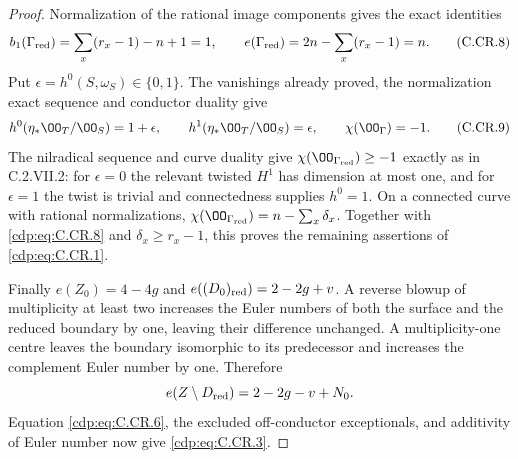 \begin{proof}
Normalization of the rational image components gives the
exact identities
\[
 b_1(\Gamma_{\rm red})
   =\sum_x(r_x-1)-n+1=1,\qquad
 e(\Gamma_{\rm red})=2n-\sum_x(r_x-1)=n.
\tag{C.CR.8}\label{cdp:eq:C.CR.8}
\]
Put $\epsilon=h^0(S,\omega_S)\in\{0,1\}$.
The vanishings already proved, the normalization exact
sequence and conductor duality give
\[
 h^0(\eta_*\OO_T/\OO_S)=1+\epsilon,\qquad
 h^1(\eta_*\OO_T/\OO_S)=\epsilon,
 \qquad\chi(\OO_\Gamma)=-1.
\tag{C.CR.9}\label{cdp:eq:C.CR.9}
\]
The nilradical sequence and curve duality give
$\chi(\OO_{\Gamma_{\rm red}})\ge-1$ exactly as in
C.2.VII.2: for $\epsilon=0$ the relevant twisted $H^1$
has dimension at most one, and for $\epsilon=1$ the twist
is trivial and connectedness supplies $h^0=1$.
On a connected curve with rational normalizations,
$\chi(\OO_{\Gamma_{\rm red}})=n-\sum_x\delta_x$.
Together with \eqref{cdp:eq:C.CR.8} and $\delta_x\ge r_x-1$, this
proves the remaining assertions of \eqref{cdp:eq:C.CR.1}.

Finally $e(Z_0)=4-4g$ and
$e((D_0)_{\rm red})=2-2g+v$. A reverse blowup of
multiplicity at least two increases the Euler numbers
of both the surface and the reduced boundary by one,
leaving their difference unchanged. A multiplicity-one
centre leaves the boundary isomorphic to its predecessor
and increases the complement Euler number by one.
Therefore
\[
 e(Z\setminus D_{\rm red})=2-2g-v+N_0.
\]
Equation \eqref{cdp:eq:C.CR.6}, the excluded off-conductor exceptionals,
and additivity of Euler number now give \eqref{cdp:eq:C.CR.3}.
\end{proof}


